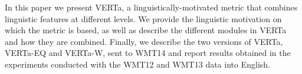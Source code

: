 In this paper we present VERTa, a linguistically-motivated metric that combines linguistic features at different levels. We provide the linguistic motivation on which the metric is based, as well as describe the different modules in VERTa and how they are combined. Finally, we describe the two versions of VERTa, VERTa-EQ and VERTa-W, sent to WMT14 and report results obtained in the experiments conducted with the WMT12 and WMT13 data into English.
